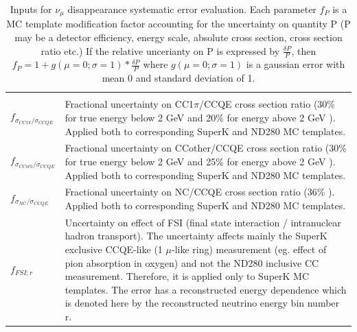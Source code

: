 \begin{table}[htb]
\begin{tabular}{p{}p{}}
{}\\
\parbox{0.12\textwidth}
{ 
    \vspace{0.2cm}
    $f_{\sigma_{CC1\pi}/\sigma_{CCQE}}$ 
}&
\parbox{0.88\textwidth}
{
    \vspace{0.2cm}
    Fractional uncertainty on CC1$\pi$/CCQE cross section ratio
    (30\% for true energy below 2 GeV and 20\% for energy above 2 GeV \cite{NIWGErr}).
    Applied both to corresponding SuperK and ND280 MC templates.\\
}\\
\parbox{0.12\textwidth}
{ 
    \vspace{0.2cm}
    $f_{\sigma_{CCoth}/\sigma_{CCQE}}$ 
}&
\parbox{0.88\textwidth}
{
    \vspace{0.2cm}
    Fractional uncertainty on CCother/CCQE cross section ratio
    (30\% for true energy below 2 GeV and 25\% for energy above 2 GeV \cite{NIWGErr}).
    Applied both to corresponding SuperK and ND280 MC templates.\\ 
}\\
\parbox{0.12\textwidth}
{ 
    \vspace{0.2cm}
    $f_{\sigma_{NC}/\sigma_{CCQE}}$ 
}&
\parbox{0.88\textwidth}
{
    \vspace{0.2cm}
    Fractional uncertainty on NC/CCQE cross section ratio
    (36\% \cite{NIWGErr}).
    Applied both to corresponding SuperK and ND280 MC templates.\\   
}\\
\parbox{0.12\textwidth}
{ 
    \vspace{0.2cm}
    $f_{FSI;r}$ 
}&
\parbox{0.88\textwidth}
{
    \vspace{0.2cm}
    Uncertainty on effect of FSI (final state interaction / intranuclear hadron transport).
    The uncertainty affects mainly the SuperK exclusive CCQE-like (1 $\mu$-like ring) measurement (eg. effect 
    of pion absorption in oxygen) and not the ND280 inclusive CC measurement.
    Therefore, it is applied only to SuperK MC templates.
    The error has a reconstructed energy dependence \cite{NIWGErr}
    which is denoted here by the reconstructed neutrino energy bin number r.\\
}\\
\hline
\end{tabular}\\[2pt]
\caption{
  Inputs for $\nu_{\mu}$ disappearance systematic error evaluation.
  Each parameter $f_{P}$ is a MC template modification factor accounting for the uncertainty
  on quantity P (P may be a detector efficiency, energy scale, 
  absolute cross section, cross section ratio etc.) 
  If the relative uncerianty on P is expressed by $\frac{\delta{P}}{P}$, then 
  $f_{P} = 1 + g(\mu=0;\sigma=1) * \frac{\delta{P}}{P}$
  where $g(\mu=0;\sigma=1)$ is a gaussian error with mean 0 and standard deviation of 1.
}
\label{tab:input_uncertainties}
\end{table}

